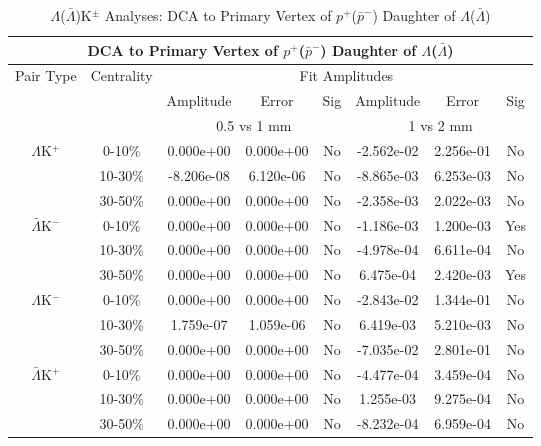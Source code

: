\documentclass[../AnalysisNoteJBuxton.tex]{subfiles}
\begin{document}




\begin{table}
 \centering
 \begin{tabular}{|c|c|c|c|c||c|c|c|}
  \multicolumn{8}{c}{DCA to Primary Vertex of $p^{+}$($\bar{p}^{-}$) Daughter of $\Lambda$($\bar{\Lambda}$)} \\
  \hline
  \multirow{3}{*}{Pair Type} & \multirow{3}{*}{Centrality} & \multicolumn{6}{c|}{Fit Amplitudes} \\
  \cline{3-8}
   & & Amplitude & Error & Sig & Amplitude & Error & Sig \\  
  \cline{3-8}
   & & \multicolumn{3}{c||}{0.5 vs 1 mm} & \multicolumn{3}{c|}{1 vs 2 mm} \\  
  \hline
  \multirow{3}{*}{$\Lambda$K$^{+}$}
   &  0-10\% & 0.000e+00 & 0.000e+00 & No & -2.562e-02 & 2.256e-01 & No \\
   & 10-30\% & -8.206e-08 & 6.120e-06 & No & -8.865e-03 & 6.253e-03 & No \\
   & 30-50\% & 0.000e+00 & 0.000e+00 & No & -2.358e-03 & 2.022e-03 & No \\
  \hline
  \multirow{3}{*}{$\bar{\Lambda}$K$^{-}$}
   &  0-10\% & 0.000e+00 & 0.000e+00 & No & -1.186e-03 & 1.200e-03 & Yes \\
   & 10-30\% & 0.000e+00 & 0.000e+00 & No & -4.978e-04 & 6.611e-04 & No \\
   & 30-50\% & 0.000e+00 & 0.000e+00 & No & 6.475e-04 & 2.420e-03 & Yes \\
  \hline \hline
  \multirow{3}{*}{$\Lambda$K$^{-}$}
   &  0-10\% & 0.000e+00 & 0.000e+00 & No & -2.843e-02 & 1.344e-01 & No \\
   & 10-30\% & 1.759e-07 & 1.059e-06 & No & 6.419e-03 & 5.210e-03 & No \\
   & 30-50\% & 0.000e+00 & 0.000e+00 & No & -7.035e-02 & 2.801e-01 & No \\
  \hline
  \multirow{3}{*}{$\bar{\Lambda}$K$^{+}$}
   &  0-10\% & 0.000e+00 & 0.000e+00 & No & -4.477e-04 & 3.459e-04 & No \\
   & 10-30\% & 0.000e+00 & 0.000e+00 & No & 1.255e-03 & 9.275e-04 & No \\
   & 30-50\% & 0.000e+00 & 0.000e+00 & No & -8.232e-04 & 6.959e-04 & No \\
  \hline
 \end{tabular}
 \caption{$\Lambda$($\bar{\Lambda}$)K$^{\pm}$ Analyses: DCA to Primary Vertex of $p^{+}$($\bar{p}^{-}$) Daughter of $\Lambda$($\bar{\Lambda}$)}
 \label{tab:DcaToPrimVertexProtonDaughtOfLamLamKch}
\end{table}
\end{document}

